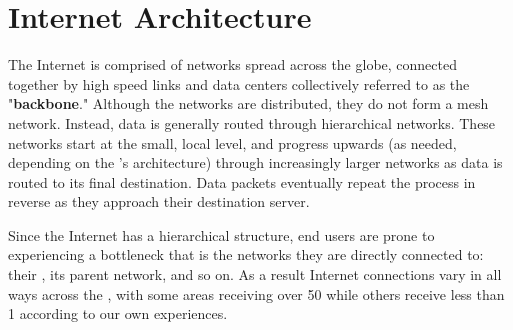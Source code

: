 \section{Internet Architecture}\label{sec:background_internet_architecture}

The Internet is comprised of networks spread across the globe, connected together by high speed links and data centers collectively referred to as the "\textbf{backbone}." Although the networks are distributed, they do not form a mesh network. Instead, data is generally routed through hierarchical networks. These networks start at the small, local level, and progress upwards (as needed, depending on the \isp's architecture) through increasingly larger networks as data is routed to its final destination. Data packets eventually repeat the process in reverse as they approach their destination server.

Since the Internet has a hierarchical structure, end users are prone to experiencing a bottleneck that is the networks they are directly connected to: their \isp, its parent network, and so on. As a result Internet connections vary in all ways across the \us, with some areas receiving over 50 \mbps while others receive less than 1 according to our own experiences.
